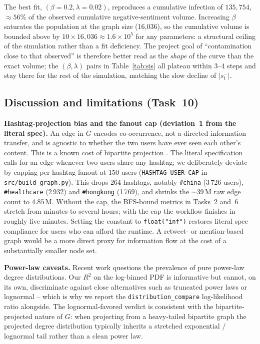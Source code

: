 \documentclass[conference]{IEEEtran}
\begin{document}
The best fit, $(\beta=0.2, \lambda=0.02)$, reproduces a
cumulative infection of $135{,}754$, $\approx 56\%$ of the
observed cumulative negative-sentiment volume.  Increasing
$\beta$ saturates the population at the graph size (16{,}036),
so the cumulative volume is bounded above by $10 \times
16{,}036 \approx 1.6\!\times\!10^{5}$ for any parameters: a
structural ceiling of the simulation rather than a fit
deficiency.  The project goal of ``contamination close to that
observed'' is therefore better read as the \emph{shape} of the
curve than the exact volume; the $(\beta, \lambda)$ pairs in
Table~\ref{tab:sis} all plateau within 3--4 steps and stay
there for the rest of the simulation, matching the slow decline
of $|s^{-}_{t}|$.

\subsection{Discussion and limitations (Task~10)}
\label{sec:disc}
\textbf{Hashtag-projection bias and the fanout cap (deviation~1
from the literal spec).}  An edge in $G$ encodes
co-occurrence, not a directed information transfer, and is
agnostic to whether the two users have ever seen each other's
content.  This is a known cost of bipartite projection
\cite{newman2001scientific}.  The literal specification calls
for an edge whenever two users share any hashtag; we
deliberately deviate by capping per-hashtag fanout at 150 users
(\texttt{HASHTAG\_USER\_CAP} in \texttt{src/build\_graph.py}).
This drops 264 hashtags, notably \texttt{\#china} (3\,726
users), \texttt{\#healthcare} (2\,932) and \texttt{\#hongkong}
(1\,769), and shrinks the $\sim$39\,M raw edge count to 4.85\,M.
Without the cap, the BFS-bound metrics in Tasks~2 and~6
stretch from minutes to several hours; with the cap the
workflow finishes in roughly five minutes.  Setting the
constant to \texttt{float("inf")} restores literal spec
compliance for users who can afford the runtime.  A retweet- or
mention-based graph would be a more direct proxy for
information flow at the cost of a substantially smaller node
set.

\textbf{Power-law caveats.}  Recent work
\cite{broido2019scale} questions the prevalence of pure
power-law degree distributions.  Our $R^{2}$ on the
log-binned PDF is informative but cannot, on its own,
discriminate against close alternatives such as truncated
power laws or lognormal -- which is why we report the
\texttt{distribution\_compare} log-likelihood ratio
\cite{clauset2009powerlaw} alongside.  The lognormal-favored
verdict is consistent with the bipartite-projected nature of
$G$: when projecting from a heavy-tailed bipartite graph the
projected degree distribution typically inherits a stretched
exponential / lognormal tail rather than a clean power law.
\end{document}
